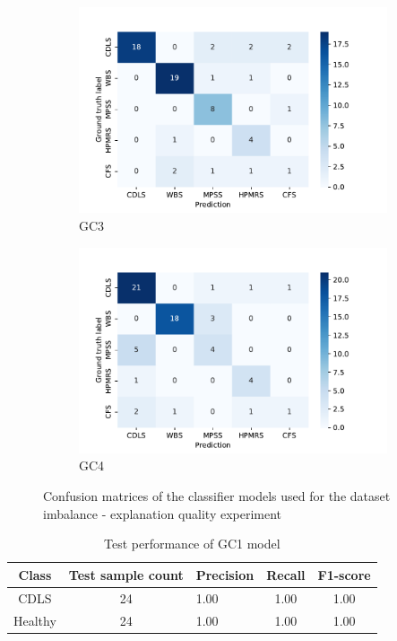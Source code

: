 \documentclass[../report.tex]{subfiles}
\begin{document}
\begin{figure}[H]
\begin{subfigure}[b]{0.45\textwidth}
    		\includegraphics[width=\textwidth]{images/class_b_conf.pdf}
    					\caption{GC3}
    	\end{subfigure}
    	\begin{subfigure}[b]{0.45\textwidth}
    		\centering
    		\includegraphics[width=\textwidth]{images/class_i_conf.pdf}
    					\caption{GC4}
    	\end{subfigure}
    \caption{Confusion matrices of the classifier models used for the dataset imbalance - explanation quality experiment}
	\end{figure}

	\begin{table}[H]
		\centering
		\begin{tabular}{|c|c|l|c|c|}
			\hline
			Class   & Test sample count & Precision & Recall & F1-score \\ \hline
			CDLS    & 24                & 1.00      & 1.00   & 1.00     \\ \hline
			Healthy & 24                & 1.00      & 1.00   & 1.00     \\ \hline
		\end{tabular}
	\caption{Test performance of GC1 model}
	\end{table}
\end{document}
